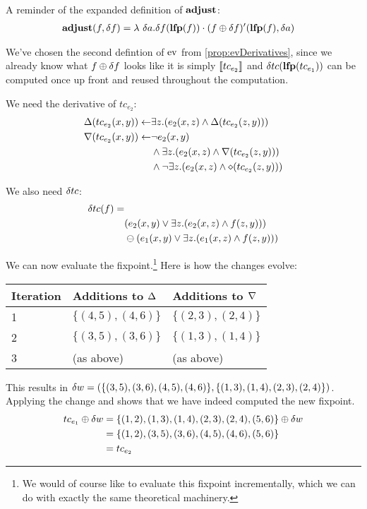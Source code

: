 A reminder of the expanded definition of $\mathbf{adjust}$:
\begin{align*}
  \mathbf{adjust}(f, \delta f) &= \lambda\ \delta a. \delta f(\mathbf{lfp}(f)) \cdot (f \oplus \delta f)'(\mathbf{lfp}(f), \delta a)
\end{align*}

We've chosen the second defintion of $\operatorname{ev}$ from \cref{prop:evDerivatives}, since
we already know what $f \oplus \delta f$ looks like \textemdash{} it is simply
$\llbracket tc_{e_2} \rrbracket$ \textemdash{} and $\delta tc(\mathbf{lfp}(tc_{e_1}))$ can be
computed once up front and reused throughout the computation.

We need the derivative of $tc_{e_2}$:
\begin{align*}
  \Delta(tc_{e_2}(x, y)) \leftarrow & \exists z. (e_2(x,z) \wedge \Delta(tc_{e_2}(z, y)))\\
  \nabla(tc_{e_2}(x, y)) \leftarrow & \neg e_2(x, y)\\
    &\wedge
    \exists z . (e_2(x, z) \wedge \nabla(tc_{e_2}(z, y)))\\
    &\wedge
    \neg \exists z . (e_2(x, z) \wedge \diamond(tc_{e_2}(z,y)))
\end{align*}

We also need $\delta tc$:
\begin{align*}
  \delta tc(f) = &\\
  &(e_2(x,y) \vee \exists z . (e_2(x,z) \wedge f(z,y))) \\
  &\ominus (e_1(x,y) \vee \exists z . (e_1(x,z) \wedge f(z,y)))
\end{align*}

We can now evaluate the fixpoint.\footnote{We would of course like to evaluate this fixpoint
  incrementally, which we can do with exactly the same theoretical machinery.}
Here is how the changes evolve:
\begin{center}
  \begin{tabular} {p{3.5em} p{10em} p{10em}}
    Iteration & Additions to $\Delta$ & Additions to $\nabla$ \\
    \toprule
    1 & $\{ (4,5), (4,6) \}$ & $\{ (2,3), (2,4) \}$\\
    2 & $\{ (3,5), (3,6) \}$ & $\{ (1,3), (1,4) \}$\\
    3 & (as above) & (as above) \\
    \bottomrule
  \end{tabular}
\end{center}
\medskip

This results in $\delta w = (\{ (3,5), (3,6), (4,5), (4,6)\}, \{(1,3), (1,4), (2,3), (2,4)\})$.
Applying the change and shows that we have indeed computed the new fixpoint.
\begin{align*}
  tc_{e_1} \oplus \delta w &= \{(1,2), (1,3), (1,4), (2,3), (2,4), (5,6)\} \oplus \delta w\\
  &= \{(1,2), (3,5), (3,6), (4,5), (4,6), (5,6)\}\\
  &= tc_{e_2}
\end{align*}

